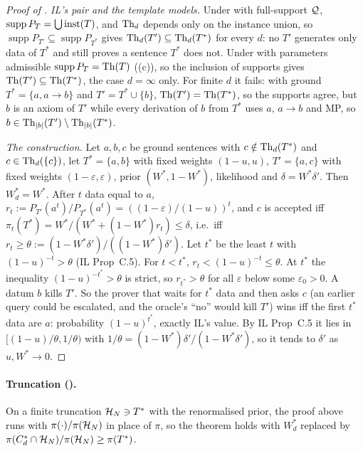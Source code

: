 \begin{proof}[Proof of ]
\emph{IL's pair and the template models.} Under \Lzero{} with full-support $\mathcal{Q}$, $\operatorname{supp}P_T=\bigcup\mathrm{inst}(T)$, and $\mathrm{Th}_d$ depends only on the instance union, so $\operatorname{supp}P_{T'}\subseteq\operatorname{supp}P_{T^*}$ gives $\mathrm{Th}_d(T')\subseteq\mathrm{Th}_d(T^*)$ for every $d$: no $T'$ generates only data of $T^*$ and still proves a sentence $T^*$ does not. Under \Lone{} with parameters admissible $\operatorname{supp}P_T=\mathrm{Th}(T)$ ((c)), so the inclusion of supports gives $\mathrm{Th}(T')\subseteq\mathrm{Th}(T^*)$, the case $d=\infty$ only. For finite $d$ it fails: with ground $T^*=\{a,a\to b\}$ and $T'=T^*\cup\{b\}$, $\mathrm{Th}(T')=\mathrm{Th}(T^*)$, so the supports agree, but $b$ is an axiom of $T'$ while every derivation of $b$ from $T^*$ uses $a$, $a\to b$ and MP, so $b\in\mathrm{Th}_{|b|}(T')\setminus\mathrm{Th}_{|b|}(T^*)$.

\emph{The construction.} Let $a,b,c$ be ground sentences with $c\notin\mathrm{Th}_d(T^*)$ and $c\in\mathrm{Th}_d(\{c\})$, let $T^*=\{a,b\}$ with fixed weights $(1-u,u)$, $T'=\{a,c\}$ with fixed weights $(1-\varepsilon,\varepsilon)$, prior $(W^*,1-W^*)$, likelihood \Lzero{} and $\delta=W^*\delta'$. Then $W^*_d=W^*$. After $t$ data equal to $a$, $r_t:=P_{T'}(a^t)/P_{T^*}(a^t)=((1-\varepsilon)/(1-u))^t$, and $c$ is accepted iff $\pi_t(T^*)=W^*/(W^*+(1-W^*)r_t)\le\delta$, i.e.\ iff $r_t\ge\theta:=(1-W^*\delta')/((1-W^*)\delta')$. Let $t^*$ be the least $t$ with $(1-u)^{-t}>\theta$ (IL Prop~C.5). For $t<t^*$, $r_t<(1-u)^{-t}\le\theta$. At $t^*$ the inequality $(1-u)^{-t^*}>\theta$ is strict, so $r_{t^*}>\theta$ for all $\varepsilon$ below some $\varepsilon_0>0$. A datum $b$ kills $T'$. So the prover that waits for $t^*$ data and then asks $c$ (an earlier query could be escalated, and the oracle's ``no'' would kill $T'$) wins iff the first $t^*$ data are $a$: probability $(1-u)^{t^*}$, exactly IL's value. By IL Prop~C.5 it lies in $[(1-u)/\theta,1/\theta)$ with $1/\theta=(1-W^*)\delta'/(1-W^*\delta')$, so it tends to $\delta'$ as $u,W^*\to0$.
\end{proof}

\paragraph{Truncation ().} On a finite truncation $\mathcal{H}_N\ni T^*$ with the renormalised prior, the proof above runs with $\pi(\cdot)/\pi(\mathcal{H}_N)$ in place of $\pi$, so the theorem holds with $W^*_d$ replaced by $\pi(C^*_d\cap\mathcal{H}_N)/\pi(\mathcal{H}_N)\ge\pi(T^*)$.

